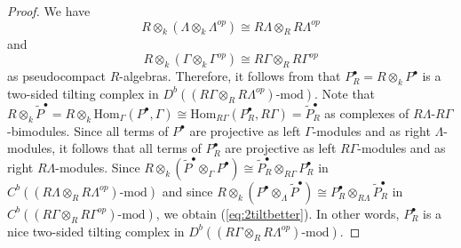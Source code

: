 \documentclass{amsart}
\theoremstyle{plain}
\theoremstyle{definition}
\theoremstyle{remark}
\begin{document}
\begin{proof}
We have
$$R\otimes_k(\Lambda\otimes_k \Lambda^{op})\cong R\Lambda\otimes_R R\Lambda^{op}$$
and 
$$R\otimes_k(\Gamma\otimes_k\Gamma^{op})\cong R\Gamma\otimes_R R\Gamma^{op}$$
as pseudocompact $R$-algebras. Therefore,
it follows from \cite[Lemma 4.3]{rickard1} that $P_R^\bullet=R\otimes_kP^\bullet$ is a two-sided tilting
complex in $D^b((R\Gamma\otimes_R R\Lambda^{op})\mbox{-$\mathrm{mod}$})$.
Note that $R\otimes_k\widetilde{P}^\bullet=R\otimes_k\mathrm{Hom}_{\Gamma}(P^\bullet,\Gamma)
\cong \mathrm{Hom}_{R\Gamma}(P_R^\bullet,R\Gamma)=\widetilde{P}_R^\bullet$ 
as complexes of $R\Lambda$-$R\Gamma$-bimodules.
Since all terms of $P^\bullet$ are projective as left $\Gamma$-modules and as right $\Lambda$-modules,
it follows that all terms of $P_R^\bullet$ are projective as left $R\Gamma$-modules and
as right $R\Lambda$-modules.
Since $R\otimes_k(\widetilde{P}^\bullet \otimes_{\Gamma}P^\bullet)
\cong \widetilde{P}_R^\bullet \otimes_{R\Gamma}P_R^\bullet$
in $C^b((R\Lambda\otimes_R R\Lambda^{op})\mbox{-mod})$
and since $R\otimes_k(P^\bullet \otimes_{\Lambda}\widetilde{P}^\bullet )
\cong P_R^\bullet \otimes_{R\Lambda}\widetilde{P}_R^\bullet$ 
in $C^b((R\Gamma\otimes_R R\Gamma^{op})\mbox{-mod})$, we obtain
(\ref{eq:2tiltbetter}). In other words, $P_R^\bullet$ is a nice two-sided tilting complex in 
$D^b((R\Gamma\otimes_R R\Lambda^{op})\mbox{-$\mathrm{mod}$})$.


\end{proof}
\end{document}
